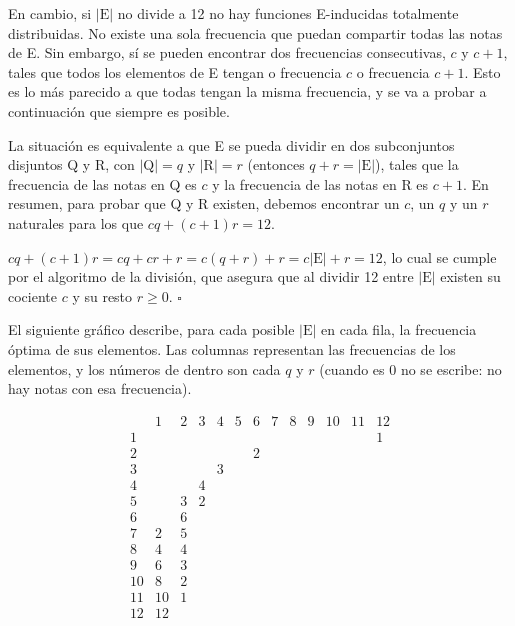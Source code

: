 		En cambio, si $|\text{E}|$ no divide a 12 no hay funciones E-inducidas totalmente distribuidas. No existe una sola frecuencia que puedan compartir todas las notas de E. Sin embargo, sí se pueden encontrar dos frecuencias consecutivas, $c$ y $c+1$, tales que todos los elementos de E tengan o frecuencia $c$ o frecuencia $c+1$. Esto es lo más parecido a que todas tengan la misma frecuencia, y se va a probar a continuación que siempre es posible. 
		
		La situación es equivalente a que E se pueda dividir en dos subconjuntos disjuntos Q y R, con $|\text{Q}|=q$ y $|\text{R}|=r$ (entonces $q+r=|\text{E}|$), tales que la frecuencia de las notas en Q es $c$ y la frecuencia de las notas en R es $c+1$. En resumen, para probar que Q y R existen, debemos encontrar un $c$, un $q$ y un $r$ naturales para los que $cq + (c+1)r=12$.
		
		$cq + (c+1)r =
		cq + cr + r =
		c(q+r) + r =
		c|\text{E}| + r = 12$, lo cual se cumple por el algoritmo de la división, que asegura que al dividir 12 entre $|\text{E}|$ existen su cociente $c$ y su resto $r\geq0$. $\square$
		
		El siguiente gráfico describe, para cada posible $|\text{E}|$ en cada fila, la frecuencia óptima de sus elementos. Las columnas representan las frecuencias de los elementos, y los números de dentro son cada $q$ y $r$ (cuando es 0 no se escribe: no hay notas con esa frecuencia).
		
		
%			
%			
%			
	
		\[\begin{array}{l|rrrrrrrrrrrr}
		&1&2&3&4&5&6&7&8&9&10&11&12\\\hline
		1&&&&&&&&&&&&1\\\hline
		2&&&&&&2\\\hline
		3&&&&3\\\hline
		4&&&4\\\hline
		5&&3&2\\\hline
		6&&6\\\hline
		7&2&5\\\hline
		8&4&4\\\hline
		9&6&3\\\hline
		10&8&2\\\hline
		11&10&1\\\hline
		12&12&\\
		\end{array}\]
		
